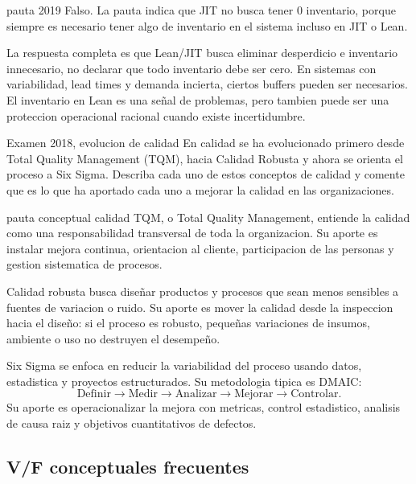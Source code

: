 \begin{pautacompleta}{pauta 2019}
Falso. La pauta indica que JIT no busca tener 0 inventario, porque siempre es necesario tener algo de inventario en el sistema incluso en JIT o Lean.

La respuesta completa es que Lean/JIT busca eliminar desperdicio e inventario innecesario, no declarar que todo inventario debe ser cero. En sistemas con variabilidad, lead times y demanda incierta, ciertos buffers pueden ser necesarios. El inventario en Lean es una señal de problemas, pero tambien puede ser una proteccion operacional racional cuando existe incertidumbre.
\end{pautacompleta}

\begin{enunciado}{Examen 2018, evolucion de calidad}
En calidad se ha evolucionado primero desde Total Quality Management (TQM), hacia Calidad Robusta y ahora se orienta el proceso a Six Sigma. Describa cada uno de estos conceptos de calidad y comente que es lo que ha aportado cada uno a mejorar la calidad en las organizaciones.
\end{enunciado}

\begin{pautacompleta}{pauta conceptual calidad}
TQM, o Total Quality Management, entiende la calidad como una responsabilidad transversal de toda la organizacion. Su aporte es instalar mejora continua, orientacion al cliente, participacion de las personas y gestion sistematica de procesos.

Calidad robusta busca diseñar productos y procesos que sean menos sensibles a fuentes de variacion o ruido. Su aporte es mover la calidad desde la inspeccion hacia el diseño: si el proceso es robusto, pequeñas variaciones de insumos, ambiente o uso no destruyen el desempeño.

Six Sigma se enfoca en reducir la variabilidad del proceso usando datos, estadistica y proyectos estructurados. Su metodologia tipica es DMAIC:
\[
  \text{Definir}\rightarrow \text{Medir}\rightarrow \text{Analizar}\rightarrow \text{Mejorar}\rightarrow \text{Controlar}.
\]
Su aporte es operacionalizar la mejora con metricas, control estadistico, analisis de causa raiz y objetivos cuantitativos de defectos.
\end{pautacompleta}

\subsection{V/F conceptuales frecuentes}

